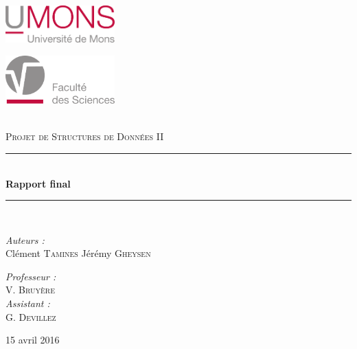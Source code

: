 \documentclass[11pt,a4paper]{article}
\theoremstyle{definition}
\theoremstyle{remark}
\newcommand{\reporttitle}{Rapport final}
\newcommand{\reportauthor}{Clément \textsc{Tamines} Jérémy \textsc{Gheysen}}
\newcommand{\reportsubject}{Projet de Structures de Données II}
\newcommand{\HRule}{\rule{\linewidth}{0.5mm}}
\begin{document}

\begin{titlepage}
\begin{center}
\begin{minipage}[t]{0.48\textwidth}
  \begin{flushleft}
     \includegraphics[width=42mm]{UMONS+txt.pdf} \\[0.5cm]
  \end{flushleft}
\end{minipage}
\begin{minipage}[t]{0.48\textwidth}
  \begin{flushright}
    \includegraphics [width=42mm]{UMONS_FS.pdf} \\[0.5cm]
  \end{flushright}
\end{minipage} \\[1.5cm]

\vspace{1.5cm}
\textsc{\Large \reportsubject}\\[0.5cm]
\HRule \\[0.4cm]
{\huge \bfseries \reporttitle}\\[0.4cm]
\HRule \\[1.5cm]

\begin{minipage}[t]{0.3\textwidth}
  \begin{flushleft} \large
    \emph{Auteurs :}\\
    \reportauthor
  \end{flushleft}
\end{minipage}
\begin{minipage}[t]{0.6\textwidth}
  \begin{flushright} \large
    \emph{Professeur :} \\
    V. \textsc{Bruyère} \\
     \emph{Assistant :} \\
    G. \textsc{Devillez}
  \end{flushright}
\end{minipage}
\vfill
{\large 15 avril 2016}

\end{center}
\end{titlepage}
\end{document}
